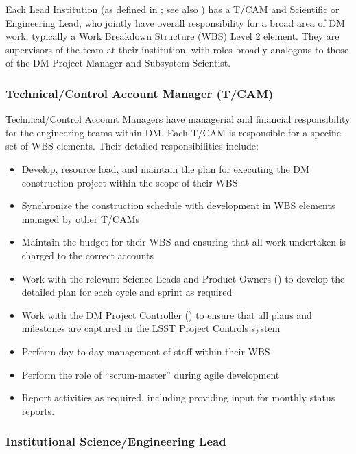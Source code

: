 Each Lead Institution (as defined in ; see also ) has a T/CAM and Scientific or Engineering Lead, who jointly have overall responsibility for a broad area of DM work, typically a Work Breakdown Structure (WBS) Level 2 element. They are supervisors of the team at their institution, with roles broadly analogous to those of the DM Project Manager and Subsystem Scientist.

\subsubsection{Technical/Control Account Manager (T/CAM) \label{role:tcam}}

Technical/Control Account Managers have managerial and financial responsibility
for the engineering teams within DM. Each T/CAM is responsible for a specific set of WBS elements. Their detailed responsibilities include:

\begin{itemize}

  \item{Develop, resource load, and maintain the plan for executing the DM construction project within the scope of their WBS}
  \item{Synchronize the construction schedule with development in WBS elements managed by other T/CAMs}
  \item{Maintain the budget for their WBS and ensuring that all work undertaken is charged to the correct accounts}
  \item{Work with the relevant Science Leads and Product Owners () to develop the detailed plan for each cycle and sprint as required}
  \item{Work with the DM Project Controller () to ensure that all plans and milestones are captured in the LSST Project Controls system}
  \item{Perform day-to-day management of staff within their WBS}
  \item{Perform the role of ``scrum-master'' during agile development}
  \item{Report activities as required, including providing input for monthly status reports.}

\end{itemize}

\subsubsection{Institutional Science/Engineering Lead \label{role:scilead}}

